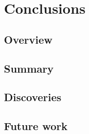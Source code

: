 \chapter{Conclusions}

\section{Overview}

\section{Summary}

\section{Discoveries}

\section{Future work}
